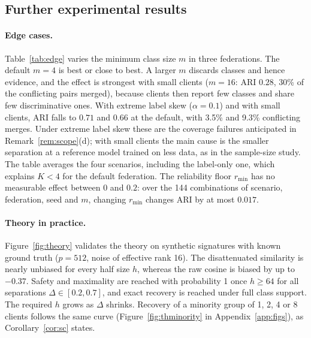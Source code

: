\subsection{Further experimental results}\label{app:more}

\paragraph{Edge cases.} Table~\ref{tab:edge} varies the minimum class size $m$ in three federations. The default $m=4$ is best or close to best. A larger $m$ discards classes and hence evidence, and the effect is strongest with small clients ($m=16$: ARI $0.28$, 30\% of the conflicting pairs merged), because clients then report few classes and share few discriminative ones. With extreme label skew ($\alpha=0.1$) and with small clients, ARI falls to $0.71$ and $0.66$ at the default, with 3.5\% and 9.3\% conflicting merges. Under extreme label skew these are the coverage failures anticipated in Remark~\ref{rem:scope}(d); with small clients the main cause is the smaller separation at a reference model trained on less data, as in the sample-size study. The table averages the four scenarios, including the label-only one, which explains $K<4$ for the default federation. The reliability floor $r_{\min}$ has no measurable effect between $0$ and $0.2$: over the 144 combinations of scenario, federation, seed and $m$, changing $r_{\min}$ changes ARI by at most $0.017$.

\begin{table}[!htbp]
\centering
\caption{Edge cases: minimum class size $m$ in three federations (Rotation, Label swap, \emph{Mixed + QS} and label-only scenarios, 3 seeds, $r_{\min}=0.02$).}\label{tab:edge}

\end{table}



\paragraph{Theory in practice.}
Figure~\ref{fig:theory} validates the theory on synthetic signatures with known ground truth ($p=512$, noise of effective rank 16). The disattenuated similarity is nearly unbiased for every half size $h$, whereas the raw cosine is biased by up to $-0.37$. Safety and maximality are reached with probability 1 once $h\ge64$ for all separations $\Delta\in[0.2,0.7]$, and exact recovery is reached under full class support. The required $h$ grows as $\Delta$ shrinks. Recovery of a minority group of 1, 2, 4 or 8 clients follows the same curve (Figure~\ref{fig:thminority} in Appendix~\ref{app:figs}), as Corollary~\ref{cor:sc} states.

